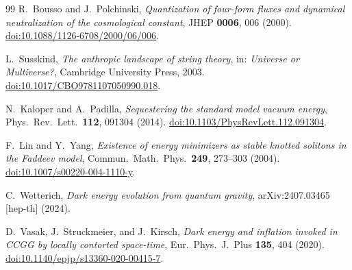 \documentclass[12pt,a4paper]{article}
\theoremstyle{definition}
\theoremstyle{plain}
\theoremstyle{remark}
\begin{document}
\begin{thebibliography}{99}
R.~Bousso and J.~Polchinski,
\textit{Quantization of four-form fluxes and dynamical neutralization of the cosmological constant},
JHEP \textbf{0006}, 006 (2000).
\href{https://doi.org/10.1088/1126-6708/2000/06/006}{doi:10.1088/1126-6708/2000/06/006}.

L.~Susskind,
\textit{The anthropic landscape of string theory},
in: \textit{Universe or Multiverse?}, Cambridge University Press, 2003.
\href{https://doi.org/10.1017/CBO9781107050990.018}{doi:10.1017/CBO9781107050990.018}.

N.~Kaloper and A.~Padilla,
\textit{Sequestering the standard model vacuum energy},
Phys.\ Rev.\ Lett.\ \textbf{112}, 091304 (2014).
\href{https://doi.org/10.1103/PhysRevLett.112.091304}{doi:10.1103/PhysRevLett.112.091304}.

F.~Lin and Y.~Yang,
\textit{Existence of energy minimizers as stable knotted solitons in the Faddeev model},
Commun.\ Math.\ Phys.\ \textbf{249}, 273--303 (2004).
\href{https://doi.org/10.1007/s00220-004-1110-y}{doi:10.1007/s00220-004-1110-y}.

C.~Wetterich,
\textit{Dark energy evolution from quantum gravity},
arXiv:2407.03465 [hep-th] (2024).

D.~Vasak, J.~Struckmeier, and J.~Kirsch,
\textit{Dark energy and inflation invoked in CCGG by locally contorted space-time},
Eur.\ Phys.\ J.\ Plus \textbf{135}, 404 (2020).
\href{https://doi.org/10.1140/epjp/s13360-020-00415-7}{doi:10.1140/epjp/s13360-020-00415-7}.

\end{thebibliography}
\end{document}

